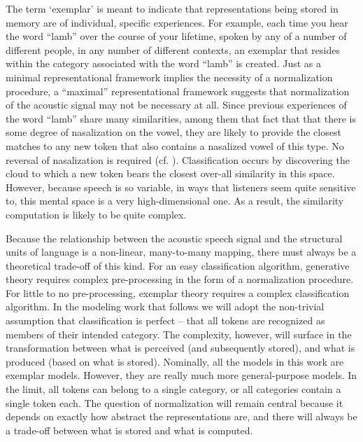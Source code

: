 The term `exemplar' is meant to indicate that representations being
stored in memory are of individual, specific experiences. For example,
each time you hear the word “lamb” over the course of your lifetime,
spoken by any of a number of different people, in any number of different
contexts, an exemplar that resides within the category associated
with the word “lamb” is created. Just as a minimal representational
framework implies the necessity of a normalization procedure, a “maximal”
representational framework suggests that normalization of the acoustic
signal may not be necessary at all. Since previous experiences of
the word “lamb” share many similarities, among them that fact
that that there is some degree of nasalization on the vowel, they
are likely to provide the closest matches to any new token that also
contains a nasalized vowel of this type. No reversal of nasalization
is required (cf. \citealt{Johnson1997a}). Classification occurs by
discovering the cloud to which a new token bears the closest over-all
similarity in this space. However, because speech is so variable,
in ways that listeners seem quite sensitive to, this mental space
is a very high-dimensional one. As a result, the similarity computation
is likely to be quite complex. 

Because the relationship between the acoustic speech signal and the
structural units of language is a non-linear, many-to-many mapping,
there must always be a theoretical trade-off of this kind. For an
easy classification algorithm, generative theory requires complex
pre-processing in the form of a normalization procedure. For little
to no pre-processing, exemplar theory requires a complex classification
algorithm. In the modeling work that follows we will adopt the non-trivial
assumption that classification is perfect – that all tokens are recognized
as members of their intended category. The complexity, however, will
surface in the transformation between what is perceived (and subsequently
stored), and what is produced (based on what is stored). Nominally,
all the models in this work are exemplar models. However, they are
really much more general-purpose models. In the limit, all tokens
can belong to a single category, or all categories contain a single
token each. The question of normalization will remain central because
it depends on exactly how abstract the representations are, and there
will always be a trade-off between what is stored and what is computed. 
